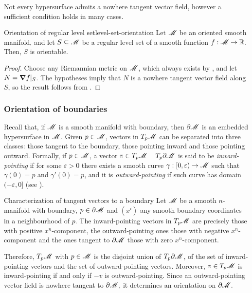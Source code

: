 Not every hypersurface admits a nowhere tangent vector field, however a sufficient condition holds in many cases.

\begin{lemma}{Orientation of regular level set}{level-set-orientation}
  Let $ \mathscr{M} $ be an oriented smooth manifold, and let $ S \subseteq \mathscr{M} $ be a regular level set of a smooth function $ f : \mathscr{M} \rightarrow \mathbb{R} $. Then, $ S $ is orientable.
\end{lemma}

\begin{proofbox}
  \begin{proof}
    Choose any Riemannian metric on $ \mathscr{M} $, which always exists by , and let $ N = \boldsymbol{\nabla} f \vert_S $. The hypotheses imply that $ N $ is a nowhere tangent vector field along $ S $, so the result follows from .
  \end{proof}
\end{proofbox}

\subsubsection{Orientation of boundaries}

Recall that, if $ \mathscr{M} $ is a smooth manifold with boundary, then $ \partial \mathscr{M} $ is an embedded hypersurface in $ \mathscr{M} $. Given $ p \in \mathscr{M} $, vectors in $ T_p\mathscr{M} $ can be separated into three classes: those tangent to the boundary, those pointing inward and those pointing outward. Formally, if $ p \in \mathscr{M} $, a vector $ v \in T_p\mathscr{M} - T_p \partial \mathscr{M} $ is said to be \emph{inward-pointing} if for some $ \varepsilon > 0 $ there exists a smooth curve $ \gamma : [0,\varepsilon) \rightarrow \mathscr{M} $ such that $ \gamma(0) = p $ and $ \gamma'(0) = p $, and it is \emph{outward-pointing} if such curve has domain $ (-\varepsilon,0] $ (see ).

\begin{lemma}{Characterization of tangent vectors to a boundary}{}
  Let $ \mathscr{M} $ be a smooth $ n $-manifold with boundary, $ p \in \partial \mathscr{M} $ and $ (x^i) $ any smooth boundary coordinates in a neighbourhood of $ p $. The inward-pointing vectors in $ T_p\mathscr{M} $ are precisely those with positive $ x^n $-component, the outward-pointing ones those with negative $ x^n $-component and the ones tangent to $ \partial \mathscr{M} $ those with zero $ x^n $-component.
\end{lemma}

Therefore, $ T_p\mathscr{M} $ with $ p \in \mathscr{M} $ is the disjoint union of $ T_p \partial \mathscr{M} $, of the set of inward-pointing vectors and the set of outward-pointing vectors. Moreover, $ v \in T_p\mathscr{M} $ is inward-pointing if and only if $ -v $ is outward-pointing.
Since an outward-pointing vector field is nowhere tangent to $ \partial \mathscr{M} $, it determines an orientation on $ \partial \mathscr{M} $.

